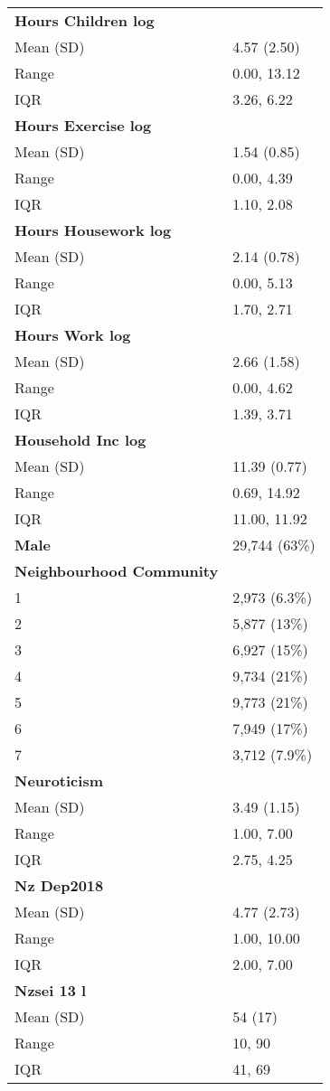 \documentclass[
  singlecolumn]{article}
\begin{document}
\begin{longtable}[]{@{}ll@{}}
\textbf{Hours Children log} & \\
Mean (SD) & 4.57 (2.50) \\
Range & 0.00, 13.12 \\
IQR & 3.26, 6.22 \\
\textbf{Hours Exercise log} & \\
Mean (SD) & 1.54 (0.85) \\
Range & 0.00, 4.39 \\
IQR & 1.10, 2.08 \\
\textbf{Hours Housework log} & \\
Mean (SD) & 2.14 (0.78) \\
Range & 0.00, 5.13 \\
IQR & 1.70, 2.71 \\
\textbf{Hours Work log} & \\
Mean (SD) & 2.66 (1.58) \\
Range & 0.00, 4.62 \\
IQR & 1.39, 3.71 \\
\textbf{Household Inc log} & \\
Mean (SD) & 11.39 (0.77) \\
Range & 0.69, 14.92 \\
IQR & 11.00, 11.92 \\
\textbf{Male} & 29,744 (63\%) \\
\textbf{Neighbourhood Community} & \\
1 & 2,973 (6.3\%) \\
2 & 5,877 (13\%) \\
3 & 6,927 (15\%) \\
4 & 9,734 (21\%) \\
5 & 9,773 (21\%) \\
6 & 7,949 (17\%) \\
7 & 3,712 (7.9\%) \\
\textbf{Neuroticism} & \\
Mean (SD) & 3.49 (1.15) \\
Range & 1.00, 7.00 \\
IQR & 2.75, 4.25 \\
\textbf{Nz Dep2018} & \\
Mean (SD) & 4.77 (2.73) \\
Range & 1.00, 10.00 \\
IQR & 2.00, 7.00 \\
\textbf{Nzsei 13 l} & \\
Mean (SD) & 54 (17) \\
Range & 10, 90 \\
IQR & 41, 69 \\

\end{longtable}
\end{document}
